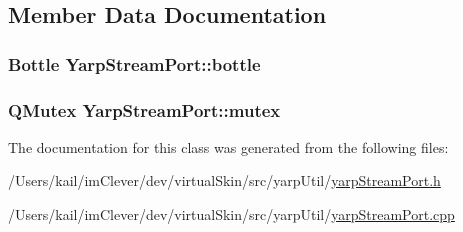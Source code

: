 \subsection{Member Data Documentation}
\hypertarget{class_yarp_stream_port_a02845704378d6350813b496589403cd7}{
\subsubsection[{bottle}]{\setlength{\rightskip}{0pt plus 5cm}Bottle {\bf YarpStreamPort::bottle}}}
\label{class_yarp_stream_port_a02845704378d6350813b496589403cd7}
\hypertarget{class_yarp_stream_port_afe137a99b998f77163794f17f87c1af6}{
\subsubsection[{mutex}]{\setlength{\rightskip}{0pt plus 5cm}QMutex {\bf YarpStreamPort::mutex}}}
\label{class_yarp_stream_port_afe137a99b998f77163794f17f87c1af6}


The documentation for this class was generated from the following files:\begin{DoxyCompactItemize}
\item 
/Users/kail/imClever/dev/virtualSkin/src/yarpUtil/\hyperlink{yarp_stream_port_8h}{yarpStreamPort.h}\item 
/Users/kail/imClever/dev/virtualSkin/src/yarpUtil/\hyperlink{yarp_stream_port_8cpp}{yarpStreamPort.cpp}\end{DoxyCompactItemize}
